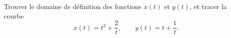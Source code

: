 \begin{exercice}\label{exodevoir3-0002}

Trouver le domaine de définition des fonctions $x(t)$ et $y(t)$, et tracer la courbe 
\[ x (t) =t^{2} + \frac{2}{t} ,\qquad y (t) = t + \frac{1}{t}.
\]

\end{exercice}
